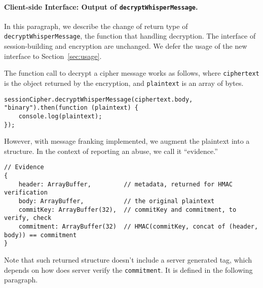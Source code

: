 \documentclass{article}
\begin{document}
\paragraph{Client-side Interface: Output of {\tt decryptWhisperMessage}.}
In this paragraph, 
we describe the change of return type of {\tt decryptWhisperMessage},
the function that handling decryption.
The interface of session-building and encryption are unchanged.
We defer the usage of the new interface to Section~\ref{sec:usage}.

The function call to decrypt a cipher message works as follows,
where {\tt ciphertext} is the object returned by the encryption,
and {\tt plaintext} is an array of bytes.
{\small
\begin{verbatim}
sessionCipher.decryptWhisperMessage(ciphertext.body, "binary").then(function (plaintext) {
    console.log(plaintext);
});
\end{verbatim}
}
However, with message franking implemented,
we augment the plaintext into a structure.
In the context of reporting an abuse, we call it ``evidence.''
{\small
\begin{verbatim}
// Evidence
{
    header: ArrayBuffer,         // metadata, returned for HMAC verification
    body: ArrayBuffer,           // the original plaintext
    commitKey: ArrayBuffer(32),  // commitKey and commitment, to verify, check
    commitment: ArrayBuffer(32)  // HMAC(commitKey, concat of (header, body)) == commitment
}
\end{verbatim}
}
Note that such returned structure doesn't include a server generated tag,
which depends on how does server verify the {\tt commitment}.
It is defined in the following paragraph.
\end{document}
